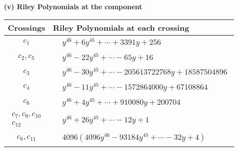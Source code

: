 \documentclass[1p]{elsarticle_modified}
\theoremstyle{definition}
\begin{document}
\newpage\renewcommand{\arraystretch}{1}
\flushleft \textbf{(v) Riley Polynomials at the component}\newline \\
\begin{tabular}{m{50pt}|m{274pt}}
Crossings & \hspace{64pt}Riley Polynomials at each crossing \\
\hline $$\begin{aligned}c_{1}\end{aligned}$$&$\begin{aligned}
&y^{46}+6 y^{45}+\cdots+3391 y+256
\end{aligned}$\\
\hline $$\begin{aligned}c_{2},c_{5}\end{aligned}$$&$\begin{aligned}
&y^{46}-22 y^{45}+\cdots-65 y+16
\end{aligned}$\\
\hline $$\begin{aligned}c_{3}\end{aligned}$$&$\begin{aligned}
&y^{46}-30 y^{45}+\cdots-205613722768 y+18587504896
\end{aligned}$\\
\hline $$\begin{aligned}c_{4}\end{aligned}$$&$\begin{aligned}
&y^{46}-11 y^{45}+\cdots-1572864000 y+67108864
\end{aligned}$\\
\hline $$\begin{aligned}c_{6}\end{aligned}$$&$\begin{aligned}
&y^{46}+4 y^{45}+\cdots+910080 y+200704
\end{aligned}$\\
\hline $$\begin{aligned}c_{7},c_{9},c_{10}\\c_{12}\end{aligned}$$&$\begin{aligned}
&y^{46}+26 y^{45}+\cdots-12 y+1
\end{aligned}$\\
\hline $$\begin{aligned}c_{8},c_{11}\end{aligned}$$&$\begin{aligned}
&4096(4096 y^{46}-93184 y^{45}+\cdots-32 y+4)
\end{aligned}$\\
\hline
\end{tabular}\\~\\
\end{document}
